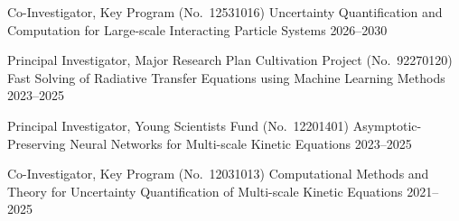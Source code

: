 

\begin{cventries}

  \cventry
  {Co-Investigator, Key Program (No.~12531016)} %
  {Uncertainty Quantification and Computation for Large-scale Interacting Particle Systems} %
  {} %
  {2026--2030} %
  {} %

  \cventry
  {Principal Investigator, Major Research Plan Cultivation Project (No.~92270120)} %
  {Fast Solving of Radiative Transfer Equations using Machine Learning Methods} %
  {} %
  {2023--2025} %
  {} %

  \cventry
  {Principal Investigator, Young Scientists Fund (No.~12201401)} %
  {Asymptotic-Preserving Neural Networks for Multi-scale Kinetic Equations} %
  {} %
  {2023--2025} %
  {} %

  \cventry
  {Co-Investigator, Key Program (No.~12031013)} %
  {Computational Methods and Theory for Uncertainty Quantification of Multi-scale Kinetic Equations} %
  {} %
  {2021--2025} %
  {} %

\end{cventries}


